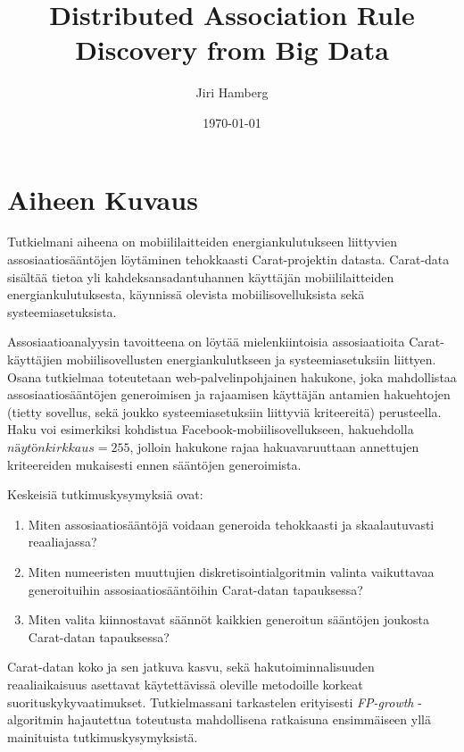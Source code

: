 \documentclass[finnish]{tktltiki2}
\title{Distributed Association Rule Discovery from Big Data}
\author{Jiri Hamberg}
\date{\today}
\theoremstyle{definition}
\theoremstyle{remark}
\begin{document}


\maketitle        %



\mainmatter       %

\section*{Aiheen Kuvaus}

Tutkielmani aiheena on mobiililaitteiden energiankulutukseen liittyvien assosiaatiosääntöjen löytäminen tehokkaasti Carat-projektin datasta. Carat-data sisältää tietoa yli kahdeksansadantuhannen käyttäjän mobiililaitteiden energiankulutuksesta, käynnissä olevista mobiilisovelluksista sekä systeemiasetuksista. 

Assosiaatioanalyysin tavoitteena on löytää mielenkiintoisia assosiaatioita Carat-käyttäjien mobiilisovellusten energiankulutkseen ja systeemiasetuksiin liittyen. Osana tutkielmaa toteutetaan web-palvelinpohjainen hakukone, joka mahdollistaa assosiaatiosääntöjen generoimisen ja rajaamisen käyttäjän antamien hakuehtojen (tietty sovellus, sekä joukko systeemiasetuksiin liittyviä kriteereitä) perusteella. Haku voi esimerkiksi kohdistua Facebook-mobiilisovellukseen, hakuehdolla $näytönkirkkaus=255$, jolloin hakukone rajaa hakuavaruuttaan annettujen kriteereiden mukaisesti ennen sääntöjen generoimista.  

Keskeisiä tutkimuskysymyksiä ovat: 

\begin{enumerate}
	\item Miten assosiaatiosääntöjä voidaan generoida tehokkaasti ja skaalautuvasti reaaliajassa?
	\item Miten numeeristen muuttujien diskretisointialgoritmin valinta vaikuttavaa generoituihin assosiaatiosääntöihin Carat-datan tapauksessa?
	\item Miten valita kiinnostavat säännöt kaikkien generoitun sääntöjen joukosta Carat-datan tapauksessa? 
\end{enumerate}

Carat-datan koko ja sen jatkuva kasvu, sekä hakutoiminnalisuuden reaaliaikaisuus asettavat käytettävissä oleville metodoille korkeat suorituskykyvaatimukset. Tutkielmassani tarkastelen erityisesti \textit{FP-growth} -algoritmin hajautettua toteutusta mahdollisena ratkaisuna ensimmäiseen yllä mainituista tutkimuskysymyksistä.
\end{document}
